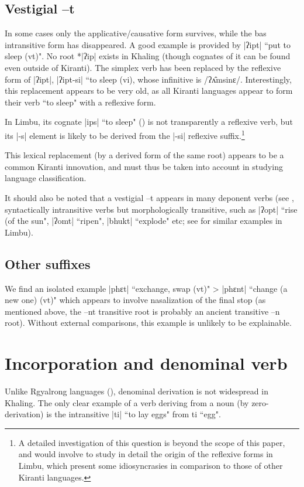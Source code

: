\documentclass[oldfontcommands,oneside,a4paper,11pt]{article}
\newcommand{\ipa}[1]{{\phon #1}} %
\begin{document}
\subsection{Vestigial --t}

In some cases only the applicative/causative form survives, while the bas intransitive form has disappeared.  A good example is provided by |ʔipt| ``put to sleep (vt)". No root *|ʔip| exists in Khaling (though cognates of it can be found even outside of Kiranti). The simplex verb has been replaced by the reflexive form of |ʔipt|, |ʔipt-si| ``to sleep (vi), whose infinitive is /ʔʌ̂msinɛ/. Interestingly, this replacement appears to be very old, as all Kiranti languages appear to form their verb ``to sleep" with a reflexive form. 

In Limbu, its cognate |ips| ``to sleep" (\citealt{michailovsky02dico}) is not transparently a reflexive verb, but its |-s| element is likely to be derived from the |-si| reflexive suffix.\footnote{A detailed investigation of this question is beyond the scope of this paper, and would involve to study in detail the origin of the reflexive forms in Limbu, which present some idiosyncrasies in comparison to those of other Kiranti languages.}

This lexical replacement (by a derived form of the same root) appears to be a common Kiranti innovation, and must thus be taken into account in studying language classification.

It should also be noted that a vestigial \ipa{--t} appears in many deponent verbs (see , syntactically intransitive verbs but morphologically transitive, such as |ʔopt| ``rise (of the sun", |ʔomt| ``ripen", |bhukt| ``explode" etc; see \citealt{michailovsky97deponent} for similar examples in Limbu).



 \subsection{Other suffixes}
We find an isolated example |phɛt| ``exchange, swap (vt)" > |phɛnt| ``change (a new one) (vt)" which appears to involve nasalization of the final stop (as mentioned above, the \ipa{--nt} transitive root is probably an ancient transitive \ipa{--n} root). Without external comparisons, this example is unlikely to be explainable.

\section{Incorporation and denominal verb}
Unlike Rgyalrong languages (\citealt{jacques12incorp}), denominal derivation is not widespread in Khaling. The only clear example of a verb deriving from a noun (by zero-derivation) is the intransitive |ti| ``to lay eggs" from \ipa{ti} ``egg".
\end{document}
